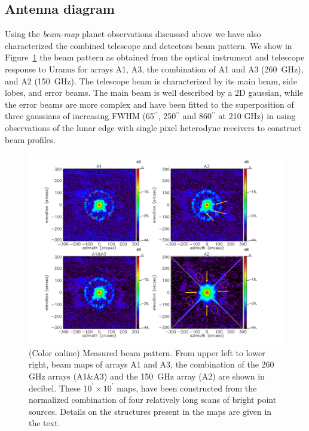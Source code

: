 \documentclass[]{aa} %
\begin{document}
\subsection{Antenna diagram}
\label{Antenna diagram}

Using the {\it beam-map} planet observations discussed above we have also characterized the combined telescope and detectors beam pattern. We show in Figure~\ref{fig:beampattern} the beam pattern as obtained from the optical instrument and telescope response to Uranus for arrays A1, A3, the combination of A1 and A3 (260~GHz), and A2 (150~GHz). The telescope beam is characterized by its main beam, side lobes, and error beams. The main beam is well described by a 2D gaussian, while the error beams are more complex and have been fitted to the superposition of three gaussians of increasing FWHM (65$^{\prime \prime}$, 250$^{\prime \prime}$ and 860$^{\prime \prime}$ at 210 GHz) in \cite{greve1998,kramer2013} using observations of the lunar edge with single pixel heterodyne receivers to construct beam profiles.

\begin{figure}[h]
   \centering
    \includegraphics[width=1.00\linewidth]{Beams_features.pdf}  
      \caption{(Color online) Measured beam pattern. From upper left to lower right, beam maps of arrays A1 and A3, the combination of the 260 GHz arrays (A1\&A3) and the 150~GHz array (A2) are shown in decibel. These $10^{\prime} \times 10^{\prime}$ maps, have been constructed from the normalized combination of four relatively long scans of bright point sources. Details on the structures present in the maps are given in the text.}
         \label{fig:beampattern}
\end{figure}
\end{document}
